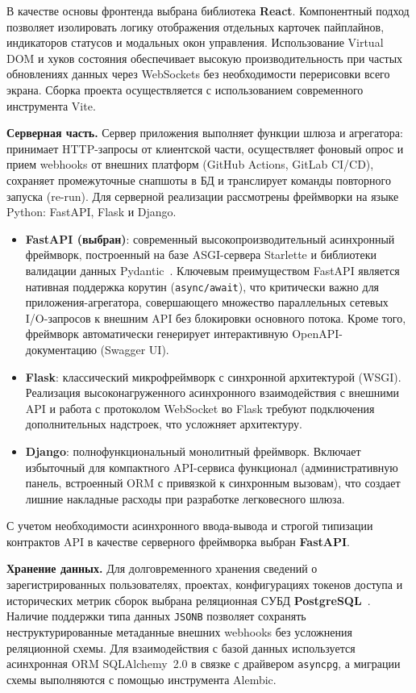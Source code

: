 В качестве основы фронтенда выбрана библиотека \textbf{React}. Компонентный подход позволяет изолировать логику отображения отдельных карточек пайплайнов, индикаторов статусов и модальных окон управления. Использование Virtual DOM и хуков состояния обеспечивает высокую производительность при частых обновлениях данных через WebSockets без необходимости перерисовки всего экрана. Сборка проекта осуществляется с использованием современного инструмента Vite.

\textbf{Серверная часть.} Сервер приложения выполняет функции шлюза и агрегатора: принимает HTTP-запросы от клиентской части, осуществляет фоновый опрос и прием webhooks от внешних платформ (GitHub Actions, GitLab CI/CD), сохраняет промежуточные снапшоты в БД и транслирует команды повторного запуска (re-run). Для серверной реализации рассмотрены фреймворки на языке Python: FastAPI, Flask и Django.

\begin{itemize}
    \item \textbf{FastAPI (выбран)}: современный высокопроизводительный асинхронный фреймворк, построенный на базе ASGI-сервера Starlette и библиотеки валидации данных Pydantic~\cite{fastapi_docs}. Ключевым преимуществом FastAPI является нативная поддержка корутин (\texttt{async/await}), что критически важно для приложения-агрегатора, совершающего множество параллельных сетевых I/O-запросов к внешним API без блокировки основного потока. Кроме того, фреймворк автоматически генерирует интерактивную OpenAPI-документацию (Swagger UI).
    \item \textbf{Flask}: классический микрофреймворк с синхронной архитектурой (WSGI). Реализация высоконагруженного асинхронного взаимодействия с внешними API и работа с протоколом WebSocket во Flask требуют подключения дополнительных надстроек, что усложняет архитектуру.
    \item \textbf{Django}: полнофункциональный монолитный фреймворк. Включает избыточный для компактного API-сервиса функционал (административную панель, встроенный ORM с привязкой к синхронным вызовам), что создает лишние накладные расходы при разработке легковесного шлюза.
\end{itemize}

С учетом необходимости асинхронного ввода-вывода и строгой типизации контрактов API в качестве серверного фреймворка выбран \textbf{FastAPI}.

\textbf{Хранение данных.} Для долговременного хранения сведений о зарегистрированных пользователях, проектах, конфигурациях токенов доступа и исторических метрик сборок выбрана реляционная СУБД \textbf{PostgreSQL}~\cite{postgresql_docs}. Наличие поддержки типа данных \texttt{JSONB} позволяет сохранять неструктурированные метаданные внешних webhooks без усложнения реляционной схемы. Для взаимодействия с базой данных используется асинхронная ORM SQLAlchemy~2.0 в связке с драйвером \texttt{asyncpg}, а миграции схемы выполняются с помощью инструмента Alembic.

